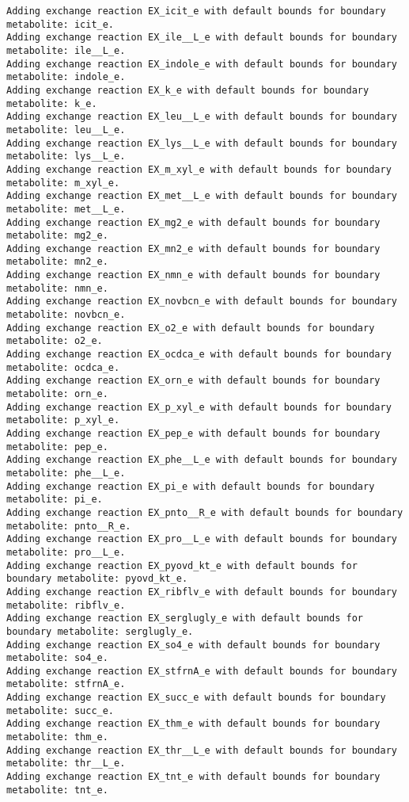 \documentclass[
  letterpaper,
  DIV=11,
  numbers=noendperiod]{scrartcl}
\begin{document}
\begin{verbatim}
Adding exchange reaction EX_icit_e with default bounds for boundary metabolite: icit_e.
Adding exchange reaction EX_ile__L_e with default bounds for boundary metabolite: ile__L_e.
Adding exchange reaction EX_indole_e with default bounds for boundary metabolite: indole_e.
Adding exchange reaction EX_k_e with default bounds for boundary metabolite: k_e.
Adding exchange reaction EX_leu__L_e with default bounds for boundary metabolite: leu__L_e.
Adding exchange reaction EX_lys__L_e with default bounds for boundary metabolite: lys__L_e.
Adding exchange reaction EX_m_xyl_e with default bounds for boundary metabolite: m_xyl_e.
Adding exchange reaction EX_met__L_e with default bounds for boundary metabolite: met__L_e.
Adding exchange reaction EX_mg2_e with default bounds for boundary metabolite: mg2_e.
Adding exchange reaction EX_mn2_e with default bounds for boundary metabolite: mn2_e.
Adding exchange reaction EX_nmn_e with default bounds for boundary metabolite: nmn_e.
Adding exchange reaction EX_novbcn_e with default bounds for boundary metabolite: novbcn_e.
Adding exchange reaction EX_o2_e with default bounds for boundary metabolite: o2_e.
Adding exchange reaction EX_ocdca_e with default bounds for boundary metabolite: ocdca_e.
Adding exchange reaction EX_orn_e with default bounds for boundary metabolite: orn_e.
Adding exchange reaction EX_p_xyl_e with default bounds for boundary metabolite: p_xyl_e.
Adding exchange reaction EX_pep_e with default bounds for boundary metabolite: pep_e.
Adding exchange reaction EX_phe__L_e with default bounds for boundary metabolite: phe__L_e.
Adding exchange reaction EX_pi_e with default bounds for boundary metabolite: pi_e.
Adding exchange reaction EX_pnto__R_e with default bounds for boundary metabolite: pnto__R_e.
Adding exchange reaction EX_pro__L_e with default bounds for boundary metabolite: pro__L_e.
Adding exchange reaction EX_pyovd_kt_e with default bounds for boundary metabolite: pyovd_kt_e.
Adding exchange reaction EX_ribflv_e with default bounds for boundary metabolite: ribflv_e.
Adding exchange reaction EX_serglugly_e with default bounds for boundary metabolite: serglugly_e.
Adding exchange reaction EX_so4_e with default bounds for boundary metabolite: so4_e.
Adding exchange reaction EX_stfrnA_e with default bounds for boundary metabolite: stfrnA_e.
Adding exchange reaction EX_succ_e with default bounds for boundary metabolite: succ_e.
Adding exchange reaction EX_thm_e with default bounds for boundary metabolite: thm_e.
Adding exchange reaction EX_thr__L_e with default bounds for boundary metabolite: thr__L_e.
Adding exchange reaction EX_tnt_e with default bounds for boundary metabolite: tnt_e.

\end{verbatim}
\end{document}
